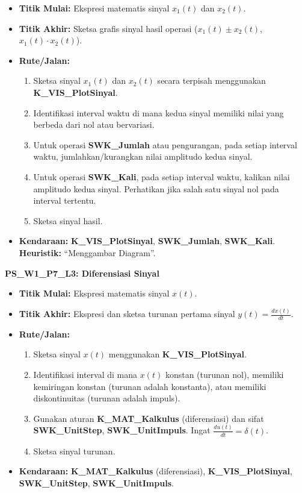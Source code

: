 \documentclass[
  letterpaper,
  DIV=11,
  numbers=noendperiod]{scrreprt}
\providecommand{\tightlist}{%
  \setlength{\itemsep}{0pt}\setlength{\parskip}{0pt}}
\begin{document}
\begin{itemize}
\tightlist
\item
  \textbf{Titik Mulai:} Ekspresi matematis sinyal \(x_1(t)\) dan
  \(x_2(t)\).
\item
  \textbf{Titik Akhir:} Sketsa grafis sinyal hasil operasi
  (\(x_1(t) \pm x_2(t)\), \(x_1(t) \cdot x_2(t)\)).
\item
  \textbf{Rute/Jalan:}

  \begin{enumerate}
  \def\labelenumi{\arabic{enumi}.}
  \tightlist
  \item
    Sketsa sinyal \(x_1(t)\) dan \(x_2(t)\) secara terpisah menggunakan
    \textbf{K\_VIS\_PlotSinyal}.
  \item
    Identifikasi interval waktu di mana kedua sinyal memiliki nilai yang
    berbeda dari nol atau bervariasi.
  \item
    Untuk operasi \textbf{SWK\_Jumlah} atau pengurangan, pada setiap
    interval waktu, jumlahkan/kurangkan nilai amplitudo kedua sinyal.
  \item
    Untuk operasi \textbf{SWK\_Kali}, pada setiap interval waktu,
    kalikan nilai amplitudo kedua sinyal. Perhatikan jika salah satu
    sinyal nol pada interval tertentu.
  \item
    Sketsa sinyal hasil.
  \end{enumerate}
\item
  \textbf{Kendaraan:} \textbf{K\_VIS\_PlotSinyal}, \textbf{SWK\_Jumlah},
  \textbf{SWK\_Kali}. \textbf{Heuristik:} ``Menggambar Diagram''.
\end{itemize}

\textbf{PS\_W1\_P7\_L3: Diferensiasi Sinyal}

\begin{itemize}
\tightlist
\item
  \textbf{Titik Mulai:} Ekspresi matematis sinyal \(x(t)\).
\item
  \textbf{Titik Akhir:} Ekspresi dan sketsa turunan pertama sinyal
  \(y(t) = \frac{dx(t)}{dt}\).
\item
  \textbf{Rute/Jalan:}

  \begin{enumerate}
  \def\labelenumi{\arabic{enumi}.}
  \tightlist
  \item
    Sketsa sinyal \(x(t)\) menggunakan \textbf{K\_VIS\_PlotSinyal}.
  \item
    Identifikasi interval di mana \(x(t)\) konstan (turunan nol),
    memiliki kemiringan konstan (turunan adalah konstanta), atau
    memiliki diskontinuitas (turunan adalah impuls).
  \item
    Gunakan aturan \textbf{K\_MAT\_Kalkulus} (diferensiasi) dan sifat
    \textbf{SWK\_UnitStep}, \textbf{SWK\_UnitImpuls}. Ingat
    \(\frac{du(t)}{dt} = \delta(t)\).
  \item
    Sketsa sinyal turunan.
  \end{enumerate}
\item
  \textbf{Kendaraan:} \textbf{K\_MAT\_Kalkulus} (diferensiasi),
  \textbf{K\_VIS\_PlotSinyal}, \textbf{SWK\_UnitStep},
  \textbf{SWK\_UnitImpuls}.
\end{itemize}
\end{document}
